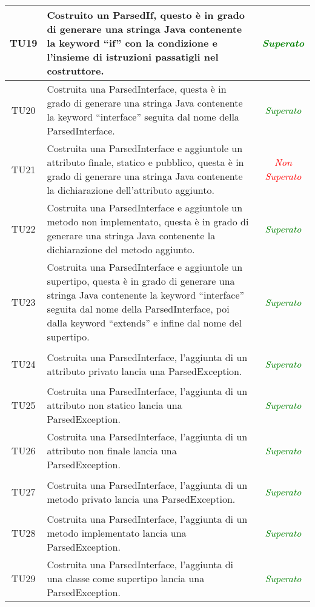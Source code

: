 \begin{longtable}{|c|>{}m{8cm}|c|}
\hypertarget{TU19}{TU19} & Costruito un ParsedIf, questo è in grado di generare una stringa Java contenente la keyword ``if'' con la condizione e l'insieme di istruzioni passatigli nel costruttore. & \textcolor{Green}{\textit{Superato}}\\ \hline
\hypertarget{TU20}{TU20} & Costruita una ParsedInterface, questa è in grado di generare una stringa Java contenente la keyword ``interface'' seguita dal nome della ParsedInterface. & \textcolor{Green}{\textit{Superato}}\\ \hline
\hypertarget{TU21}{TU21} & Costruita una ParsedInterface e aggiuntole un attributo finale, statico e pubblico, questa è in grado di generare una stringa Java contenente la dichiarazione dell'attributo aggiunto. & \textcolor{Red}{\textit{Non Superato}}\\ \hline
\hypertarget{TU22}{TU22} & Costruita una ParsedInterface e aggiuntole un metodo non implementato, questa è in grado di generare una stringa Java contenente la dichiarazione del metodo aggiunto. & \textcolor{Green}{\textit{Superato}}\\ \hline
\hypertarget{TU23}{TU23} & Costruita una ParsedInterface e aggiuntole un supertipo, questa è in grado di generare una stringa Java contenente la keyword ``interface'' seguita dal nome della ParsedInterface, poi dalla keyword ``extends'' e infine dal nome del supertipo. & \textcolor{Green}{\textit{Superato}}\\ \hline
\hypertarget{TU24}{TU24} & Costruita una ParsedInterface, l'aggiunta di un attributo privato lancia una ParsedException. & \textcolor{Green}{\textit{Superato}}\\ \hline
\hypertarget{TU25}{TU25} & Costruita una ParsedInterface, l'aggiunta di un attributo non statico lancia una ParsedException. & \textcolor{Green}{\textit{Superato}}\\ \hline
\hypertarget{TU26}{TU26} & Costruita una ParsedInterface, l'aggiunta di un attributo non finale lancia una ParsedException. & \textcolor{Green}{\textit{Superato}}\\ \hline
\hypertarget{TU27}{TU27} & Costruita una ParsedInterface, l'aggiunta di un metodo privato lancia una ParsedException. & \textcolor{Green}{\textit{Superato}}\\ \hline
\hypertarget{TU28}{TU28} & Costruita una ParsedInterface, l'aggiunta di un metodo implementato lancia una ParsedException. & \textcolor{Green}{\textit{Superato}}\\ \hline
\hypertarget{TU29}{TU29} & Costruita una ParsedInterface, l'aggiunta di una classe come supertipo lancia una ParsedException. & \textcolor{Green}{\textit{Superato}}\\ \hline

\end{longtable}
